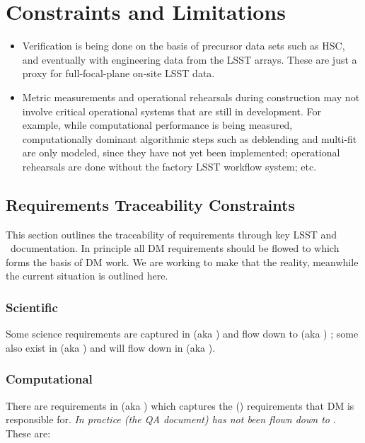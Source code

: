\section{Constraints and Limitations}

\begin{itemize}

\item Verification is being done on the basis of precursor data sets such as HSC, and eventually with engineering data from the LSST arrays. These are just a proxy for full-focal-plane on-site LSST data.

\item Metric measurements and operational rehearsals during construction may not involve critical operational systems that are still in development. For example, while computational performance is being measured, computationally dominant algorithmic steps such as deblending and multi-fit are only modeled, since they have not yet been implemented; operational rehearsals are done without the factory LSST workflow system; etc.

\end{itemize}

\subsection{Requirements Traceability Constraints}

This section outlines the traceability of requirements through key LSST and \product\ documentation. 
In principle all DM requirements should be flowed to  which forms the basis of DM work. We are working to make that the reality, meanwhile the current situation is outlined here.

\subsubsection{Scientific}

Some science requirements are captured in  (aka \LSR) and flow down to  (aka \OSS) ; some also exist in  (aka \DPDD) and will flow down in  (aka \DMSR).

\subsubsection{Computational}

There are requirements in  (aka \DMSR) which captures the  (\OSS) requirements that DM is responsible for. \textit{In practice  (the QA document) has not been flown down to }. These are:


